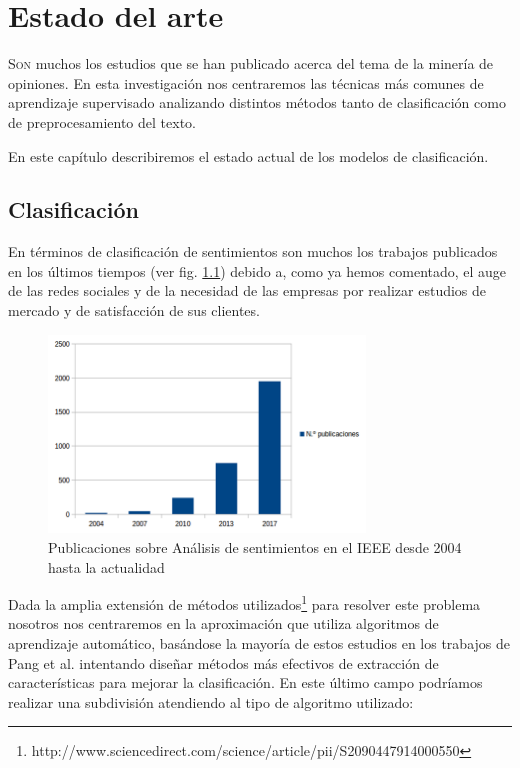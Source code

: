 

\chapter{Estado del arte}

\lettrine{S}{on} muchos los estudios que se han publicado acerca del tema de la minería de opiniones. En esta investigación nos centraremos las técnicas más comunes de aprendizaje supervisado analizando distintos métodos tanto de clasificación como de preprocesamiento del texto.

En este capítulo describiremos el estado actual de los modelos de clasificación.

\section{Clasificación}
En términos de clasificación de sentimientos son muchos los trabajos publicados en los últimos tiempos (ver fig. \ref{pubsent}) debido a, como ya hemos comentado, el auge de las redes sociales y de la necesidad de las empresas por realizar estudios de mercado y de satisfacción de sus clientes.

\begin{figure}[!ht]
	\centering
	\includegraphics[width=0.75\textwidth]{imaxes/pubsentAnalisis.png}
	\caption{Publicaciones sobre Análisis de sentimientos en el IEEE desde 2004 hasta la actualidad}
		\label{pubsent}
\end{figure}

Dada la amplia extensión de métodos utilizados\footnote{http://www.sciencedirect.com/science/article/pii/S2090447914000550} para resolver este problema nosotros nos centraremos en la aproximación que utiliza algoritmos de aprendizaje automático, basándose la mayoría de estos estudios en los trabajos de Pang et al. \cite{Pang} intentando diseñar métodos más efectivos de extracción de características para mejorar la clasificación. En este último campo podríamos realizar una subdivisión atendiendo al tipo de algoritmo utilizado:

